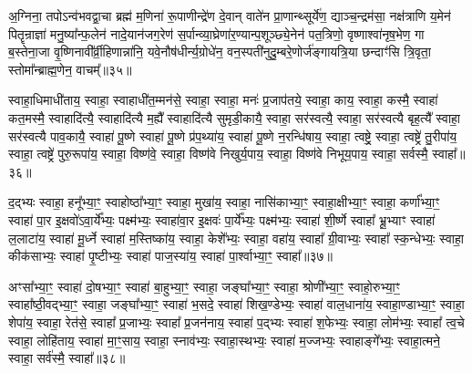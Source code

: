 {\anuvakamend[{अ॒ग्नि॒ष्टो॒मो वि॑शत्व॒ष्टाद॑श च॥13॥}]}

अ॒ग्निना॒ तपो\-ऽन्व॑भवद्वा॒चा ब्रह्म॑ म॒णिना॑ रू॒पाणीन्द्रे॑ण दे॒वान् वाते॑न प्रा॒णान्थ्सूर्ये॑ण॒ द्याञ्च॒न्द्रम॑सा॒ नक्ष॑त्राणि य॒मेन॑ पितॄन्राज्ञा॑ मनु॒ष्या᳚न्फ॒लेन॑ नादे॒यान॑जग॒रेण॑ स॒र्पान्व्या॒घ्रेणा॑र॒ण्यान्प॒शूञ्छ्ये॒नेन॑ पत॒त्रिणो॒ वृष्णाश्वा॑नृष॒भेण॒ गा ब॒स्तेना॒जा वृ॒ष्णिनावी᳚र्व्री॒हिणान्ना॑नि॒ यवे॒नौष॑धीर्न्य॒ग्रोधे॑न॒ वन॒स्पती॑नुदु॒म्बरे॒णोर्ज॑ङ्गायत्रि॒या छन्दाꣳ॑सि त्रि॒वृता॒ स्तोमा᳚न्ब्राह्म॒णेन॒ वाचम्᳚॥३५॥

{\anuvakamend[{ब्रा॒ह्म॒णेनैक॑ञ्च॥14॥}]}

स्वाहा॒धिमाधी॑ताय॒ स्वाहा॒ स्वाहाधी॑त॒म्मन॑से॒ स्वाहा॒ स्वाहा॒ मनः॑ प्र॒जाप॑तये॒ स्वाहा॒ काय॒ स्वाहा॒ कस्मै॒ स्वाहा॑ कत॒मस्मै॒ स्वाहादि॑त्यै॒ स्वाहादि॑त्यै म॒ह्यै᳚ स्वाहादि॑त्यै सुमृडी॒कायै॒ स्वाहा॒ सर॑स्वत्यै॒ स्वाहा॒ सर॑स्वत्यै बृह॒त्यै᳚ स्वाहा॒ सर॑स्वत्यै पाव॒कायै॒ स्वाहा॑ पू॒ष्णे स्वाहा॑ पू॒ष्णे प्र॑प॒थ्या॑य॒ स्वाहा॑ पू॒ष्णे न॒रन्धि॑षाय॒ स्वाहा॒ त्वष्ट्रे॒ स्वाहा॒ त्वष्ट्रे॑ तु॒रीपा॑य॒ स्वाहा॒ त्वष्ट्रे॑ पुरु॒रूपा॑य॒ स्वाहा॒ विष्ण॑वे॒ स्वाहा॒ विष्ण॑वे निखुर्य॒पाय॒ स्वाहा॒ विष्ण॑वे निभूय॒पाय॒ स्वाहा॒ सर्वस्मै॒ स्वाहा᳚॥३६॥

{\anuvakamend[{पु॒रु॒रूपा॑य॒ स्वाहा॒ दश॑ च॥15॥}]}

द॒द्भ्यः स्वाहा॒ हनू᳚भ्या॒ꣳ॒ स्वाहोष्ठा᳚भ्या॒ꣳ॒ स्वाहा॒ मुखा॑य॒ स्वाहा॒ नासि॑काभ्या॒ꣳ॒ स्वाहा॒क्षीभ्या॒ꣳ॒ स्वाहा॒ कर्णा᳚भ्या॒ꣳ॒ स्वाहा॑ पा॒र इ॒क्षवो॑\-ऽवा॒र्ये᳚भ्यः॒ पक्ष्म॑भ्यः॒ स्वाहा॑वा॒र इ॒क्षवः॑ पा॒र्ये᳚भ्यः॒ पक्ष्म॑भ्यः॒ स्वाहा॑ शी॒र्\mbox{}ष्णे स्वाहा᳚ भ्रू॒भ्याꣳ स्वाहा॑ ल॒लाटा॑य॒ स्वाहा॑ मू॒र्ध्ने स्वाहा॑ म॒स्तिष्का॑य॒ स्वाहा॒ केशे᳚भ्यः॒ स्वाहा॒ वहा॑य॒ स्वाहा᳚ ग्री॒वाभ्यः॒ स्वाहा᳚ स्क॒न्धेभ्यः॒ स्वाहा॒ कीक॑साभ्यः॒ स्वाहा॑ पृ॒ष्टीभ्यः॒ स्वाहा॑ पाज॒स्या॑य॒ स्वाहा॑ पा॒र्श्वाभ्या॒ꣳ॒ स्वाहा᳚॥३७॥

अꣳसा᳚भ्या॒ꣳ॒ स्वाहा॑ दो॒षभ्या॒ꣳ॒ स्वाहा॑ बा॒हुभ्या॒ꣳ॒ स्वाहा॒ जङ्घा᳚भ्या॒ꣳ॒ स्वाहा॒ श्रोणी᳚भ्या॒ꣳ॒ स्वाहो॒रुभ्या॒ꣳ॒ स्वाहा᳚ष्ठी॒वद्भ्या॒ꣳ॒ स्वाहा॒ जङ्घा᳚भ्या॒ꣳ॒ स्वाहा॑ भ॒सदे॒ स्वाहा॑ शिख॒ण्डेभ्यः॒ स्वाहा॑ वाल॒धाना॑य॒ स्वाहा॒ण्डाभ्या॒ꣳ॒ स्वाहा॒ शेपा॑य॒ स्वाहा॒ रेत॑से॒ स्वाहा᳚ प्र॒जाभ्यः॒ स्वाहा᳚ प्र॒जन॑नाय॒ स्वाहा॑ प॒द्भ्यः स्वाहा॑ श॒फेभ्यः॒ स्वाहा॒ लोम॑भ्यः॒ स्वाहा᳚ त्व॒चे स्वाहा॒ लोहि॑ताय॒ स्वाहा॑ मा॒ꣳ॒साय॒ स्वाहा॒ स्नाव॑भ्यः॒ स्वाहा॒स्थभ्यः॒ स्वाहा॑ म॒ज्जभ्यः॒ स्वाहाङ्गे᳚भ्यः॒ स्वाहा॒त्मने॒ स्वाहा॒ सर्व॑स्मै॒ स्वाहा᳚॥३८॥

{\anuvakamend[{पा॒र्श्वाभ्या॒ꣳ॒ स्वाहा॑ म॒ज्जभ्यः॒ स्वाहा॒ षट्च॑॥16॥}]}


